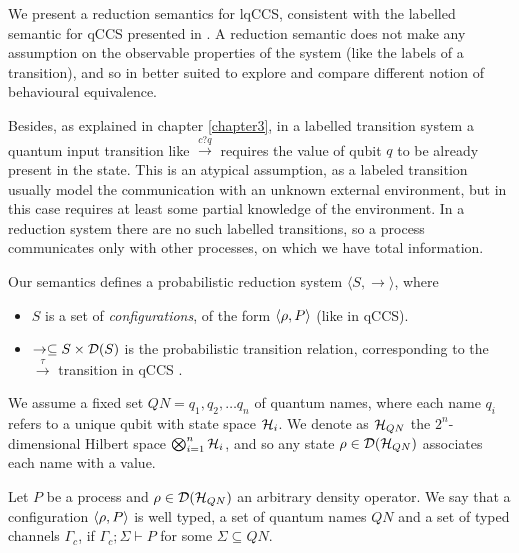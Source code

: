 We present a reduction semantics for lqCCS, consistent with the labelled semantic for qCCS presented in \cite{fengBisimulationQuantumProcesses2012, dengOpenBisimulationQuantum2012}. A reduction semantic does not make any assumption on the observable properties of the system (like the labels of a transition), and so in better suited to explore and compare different notion of behavioural equivalence.

Besides, as explained in chapter \ref{chapter3}, in a labelled transition system a quantum input transition like $\xrightarrow{c?q}$ requires the value of qubit $q$ to be already present in the state. This is an atypical assumption, as a labeled transition usually model the communication with an unknown external environment, but in this case requires at least some partial knowledge of the environment. In a reduction system there are no such labelled transitions, so a process communicates only with other processes, on which we have total information.

Our semantics defines a probabilistic reduction system $\langle S, \rightarrow \rangle$, where \begin{itemize}
\item $S$ is a set of \textit{configurations}, of the form $\langle\rho, P\rangle$ (like in qCCS).
\item $\rightarrow \subseteq S \times \mathcal{D}(S)$ is the probabilistic transition relation, corresponding to the $\xrightarrow{\tau}$ transition in qCCS \cite{fengBisimulationQuantumProcesses2012, dengOpenBisimulationQuantum2012}.
\end{itemize}

We assume a fixed set  $QN = {q_1, q_2, \ldots q_n}$ of quantum names, where each name $q_i$ refers to a unique qubit with state space $\mathcal{H}_i$. We denote as $\mathcal{H}_{QN}$ the $2^n$-dimensional Hilbert space $\bigotimes_{i=1}^n \mathcal{H}_i$, and so any state 
$\rho \in \mathcal{D}(\mathcal{H}_{QN})$ associates each name with a value.


\begin{definition}
Let $P$ be a process and $\rho \in \mathcal{D}(\mathcal{H}_{QN})$ an arbitrary density operator. We say that a configuration $\langle\rho, P\rangle$ is well typed, a set of quantum names $QN$ and a set of typed channels $\Gamma_c$, if $\Gamma_c; \Sigma \vdash P$ for some $\Sigma \subseteq QN$.

\end{definition}

